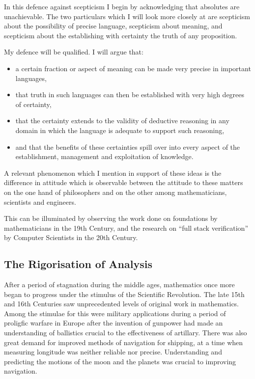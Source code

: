 \documentclass[10pt,titlepage]{book}
\begin{document}
In this defence against scepticism I begin by acknowledging that absolutes are unachievable.
The two particulars which I will look more closely at are scepticism about the possibility of precise language, scepticism about meaning, and scepticism about the establishing with certainty the truth of any proposition.

My defence will be qualified.
I will argue that:
\begin{itemize}
\item a certain fraction or aspect of meaning can be made very precise in important languages,
\item that truth in such languages can then be established with very high degrees of certainty,
\item that the certainty extends to the validity of deductive reasoning in any domain in which the language is adequate to support such reasoning,
\item and that the benefits of these certainties spill over into every aspect of the establishment, management and exploitation of knowledge.
\end{itemize}

A relevant phenomenon which I mention in support of these ideas is the difference in attitude which is observable between the attitude to these matters on the one hand of philosophers and on the other among mathematicians, scientists and engineers.

This can be illuminated by observing the work done on foundations by mathematicians in the 19th Century, and the research on ``full stack verification'' by Computer Scientists in the 20th Century.

\subsection{The Rigorisation of Analysis}

After a period of stagnation during the middle ages, mathematics once more began to progress under the stimulus of the Scientific Revolution.
The late 15th and 16th Centuries saw unprecedented levels of original work in mathematics.
Among the stimulae for this were military applications during a period of proligfic warfare in Europe after the invention of gunpower had made an understanding of ballistics crucial to the effectiveness of artillary.
There was also great demand for improved methods of navigation for shipping, at a time when measuring longitude was neither reliable nor precise.
Understanding and predicting the motions of the moon and the planets was crucial to improving navigation.
\end{document}
